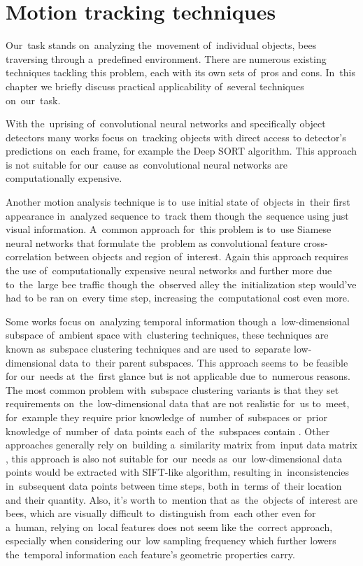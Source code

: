\chapter{Motion tracking techniques}
Our~task stands on~analyzing the~movement of~individual objects, bees traversing through a~predefined environment. There are numerous existing techniques tackling this problem, each with its own sets of~pros and cons. In~this chapter we briefly discuss practical applicability of~several techniques on~our~task.

With the~uprising of~convolutional neural networks and specifically object detectors many works focus on~tracking objects with direct access to detector's predictions on~each frame, for example the Deep SORT \cite{deep_sort} algorithm. This approach is not suitable for our~cause as~convolutional neural networks are computationally expensive.

Another motion analysis technique is to~use initial state of~objects in~their first appearance in~analyzed sequence to~track them though the~sequence using just visual information. A~common approach for~this problem is to~use Siamese neural networks \cite{siamese} that formulate the~problem as convolutional feature cross-correlation between objects and region of~interest. Again this approach requires the use of~computationally expensive neural networks and further more due to~the~large bee traffic though the~observed alley the~initialization step would've had to be ran on~every time step, increasing the~computational cost even more.

Some works focus on~analyzing temporal information though a~low-dimensional subspace of~ambient space with~clustering techniques, these techniques are known as~subspace clustering techniques \cite{subsapce-theory} and are used to~separate low-dimensional data to~their parent subspaces. This approach seems to~be feasible for our~needs at~the~first glance but is not applicable due to~numerous reasons. The most common problem with~subspace clustering variants is that they set requirements on~the~low-dimensional data that are not realistic for~us to~meet, for~example they require prior knowledge of~number of~subspaces \cite{k-subspace,k-flats-subspace} or~prior knowledge of~number of~data points each of~the~subspaces contain \cite{geometric-subspace}. Other approaches generally rely on~building a~similarity matrix from~input data matrix \cite{general-motion-seg,manifold-seg,spectral-clustering}, this approach is also not suitable for~our~needs as~our~low-dimensional data points would be extracted with SIFT-like algorithm, resulting in~inconsistencies in~subsequent data points between time steps, both in~terms of~their location and their quantity. Also, it's worth to~mention that as~the~objects of~interest are bees, which are visually difficult to~distinguish from~each other even for a~human, relying on~local features does not seem like the~correct approach, especially when considering our~low sampling frequency which further lowers the~temporal information each feature's geometric properties carry.

